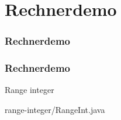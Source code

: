 \def\stitle{Rechnerdemo}
\section{\stitle}
\begin{frame}
    \frametitle{\stitle}%
\tableofcontents[current]
\end{frame}

\begin{frame}[fragile]%
  \frametitle{\stitle}%
\medskip

Range integer

{range-integer/RangeInt.java}
\end{frame}
